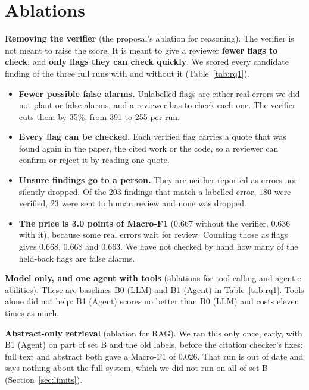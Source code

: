 \documentclass[11pt,a4paper]{article}
\begin{document}
\section{Ablations}
\textbf{Removing the verifier} (the proposal's ablation for reasoning). The verifier is not meant
to raise the score. It is meant to give a reviewer \textbf{fewer flags to check}, and \textbf{only flags they can
check quickly}. We scored every candidate finding of the three full runs with and without it
(Table~\ref{tab:rq1}).
\begin{itemize}
\item \textbf{Fewer possible false alarms.} Unlabelled flags are either real errors we did not
plant or false alarms, and a reviewer has to check each one. The verifier cuts them by 35\%, from
391 to 255 per run.
\item \textbf{Every flag can be checked.} Each verified flag carries a quote that was found again
in the paper, the cited work or the code, so a reviewer can confirm or reject it by reading one
quote.
\item \textbf{Unsure findings go to a person.} They are neither reported as errors nor silently
dropped. Of the 203 findings that match a labelled error, 180 were verified, 23 were sent to human
review and none was dropped.
\item \textbf{The price is 3.0 points of Macro-F1} (0.667 without the verifier, 0.636 with it),
because some real errors wait for review. Counting those as flags gives 0.668, 0.668 and 0.663.
We have not checked by hand how many of the held-back flags are false alarms.
\end{itemize}

\textbf{Model only, and one agent with tools} (ablations for tool calling and agentic abilities).
These are baselines B0 (LLM) and B1 (Agent) in Table~\ref{tab:rq1}. Tools alone did not help: B1 (Agent) scores no
better than B0 (LLM) and costs eleven times as much.

\textbf{Abstract-only retrieval} (ablation for RAG). We ran this only once, early, with B1 (Agent)
on part of set B and the old labels, before the citation checker's fixes: full text and abstract
both gave a Macro-F1 of 0.026. That run is out of date and says nothing about the full system,
which we did not run on all of set B (Section~\ref{sec:limits}).
\end{document}
